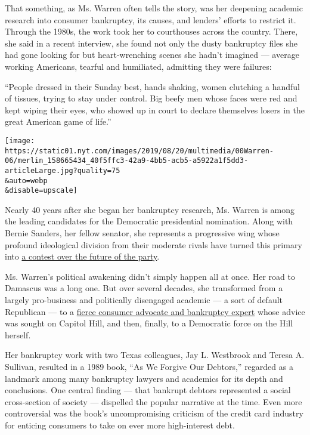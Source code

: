 That something, as Ms. Warren often tells the story, was her deepening
academic research into consumer bankruptcy, its causes, and lenders'
efforts to restrict it. Through the 1980s, the work took her to
courthouses across the country. There, she said in a recent interview,
she found not only the dusty bankruptcy files she had gone looking for
but heart-wrenching scenes she hadn't imagined --- average working
Americans, tearful and humiliated, admitting they were failures:

``People dressed in their Sunday best, hands shaking, women clutching a
handful of tissues, trying to stay under control. Big beefy men whose
faces were red and kept wiping their eyes, who showed up in court to
declare themselves losers in the great American game of life.''

\texttt{[image: https://static01.nyt.com/images/2019/08/20/multimedia/00Warren-06/merlin\_158665434\_40f5ffc3-42a9-4bb5-acb5-a5922a1f5dd3-articleLarge.jpg?quality=75\\\&auto=webp\\\&disable=upscale]}

Nearly 40 years after she began her bankruptcy research, Ms. Warren is
among the leading candidates for the Democratic presidential nomination.
Along with Bernie Sanders, her fellow senator, she represents a
progressive wing whose profound ideological division from their moderate
rivals have turned this primary into
\href{https://www.nytimes.com/2019/07/28/us/politics/democrats-2020-trump.html}{a
contest over the future of the party}.

Ms. Warren's political awakening didn't simply happen all at once. Her
road to Damascus was a long one. But over several decades, she
transformed from a largely pro-business and politically disengaged
academic --- a sort of default Republican --- to a
\href{https://www.nytimes.com/2020/01/07/us/politics/elizabeth-warren-bankruptcy-plan-biden.html}{fierce
consumer advocate and bankruptcy expert} whose advice was sought on
Capitol Hill, and then, finally, to a Democratic force on the Hill
herself.

Her bankruptcy work with two Texas colleagues, Jay L. Westbrook and
Teresa A. Sullivan, resulted in a 1989 book, ``As We Forgive Our
Debtors,'' regarded as a landmark among many bankruptcy lawyers and
academics for its depth and conclusions. One central finding --- that
bankrupt debtors represented a social cross-section of society ---
dispelled the popular narrative at the time. Even more controversial was
the book's uncompromising criticism of the credit card industry for
enticing consumers to take on ever more high-interest debt.

